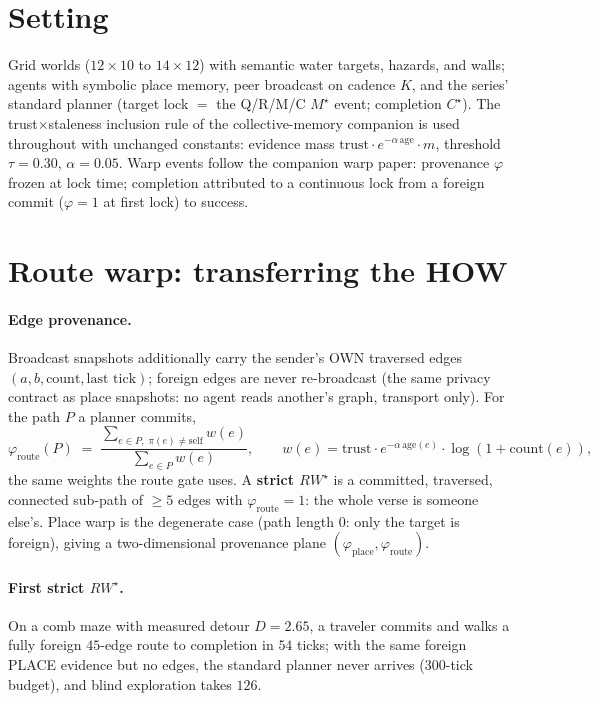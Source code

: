 \documentclass{article}
\newcommand{\rwstar}{RW^{\star}}
\newcommand{\mstar}{M^{\star}}
\newcommand{\cstar}{C^{\star}}
\newcommand{\phiroute}{\varphi_{\mathrm{route}}}
\begin{document}
\section{Setting}
\label{sec:setting}

Grid worlds ($12{\times}10$ to $14{\times}12$) with semantic water
targets, hazards, and walls; agents with symbolic place memory,
peer broadcast on cadence $K$, and the series' standard planner
(target lock $=$ the Q/R/M/C $\mstar$ event; completion $\cstar$).
The trust$\times$staleness inclusion rule of the collective-memory
companion is used throughout with unchanged constants: evidence
mass $\text{trust}\cdot e^{-\alpha\,\text{age}}\cdot m$, threshold
$\tau{=}0.30$, $\alpha{=}0.05$. Warp events follow the companion warp
paper: provenance $\varphi$ frozen at lock time; completion attributed
to a continuous lock from a foreign commit ($\varphi{=}1$ at first
lock) to success. %

\section{Route warp: transferring the HOW}
\label{sec:route}

\paragraph{Edge provenance.} Broadcast snapshots additionally carry the
sender's OWN traversed edges $(a,b,\text{count},\text{last tick})$;
foreign edges are never re-broadcast (the same privacy contract as
place snapshots: no agent reads another's graph, transport only). For
the path $P$ a planner commits,
\[
\phiroute(P) \;=\;
\frac{\sum_{e\in P,\;\pi(e)\neq\mathrm{self}} w(e)}
     {\sum_{e\in P} w(e)},
\qquad w(e) = \text{trust}\cdot e^{-\alpha\,\text{age}(e)}\cdot
\log(1{+}\text{count}(e)),
\]
the same weights the route gate uses. A \textbf{strict $\rwstar$} is a
committed, traversed, connected sub-path of $\ge 5$ edges with
$\phiroute = 1$: the whole verse is someone else's. Place warp is the
degenerate case (path length $0$: only the target is foreign), giving
a two-dimensional provenance plane $(\varphi_{\mathrm{place}},
\phiroute)$.

\paragraph{First strict $\rwstar$.} On a comb maze with measured
detour $D{=}2.65$, a traveler commits and walks a fully foreign
$45$-edge route to completion in $54$ ticks; with the same foreign
PLACE evidence but no edges, the standard planner never arrives
(300-tick budget), and blind exploration takes $126$.
\end{document}
